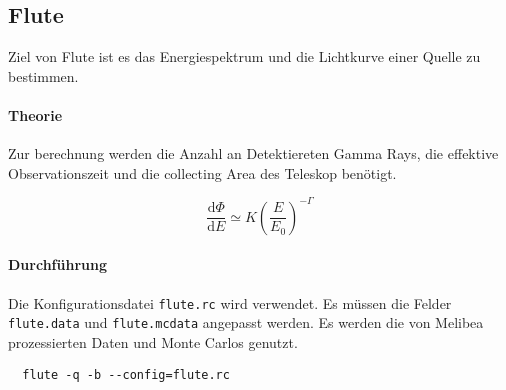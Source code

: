 \subsection{Flute}%
\label{sub:flute}
Ziel von Flute ist es das Energiespektrum und die Lichtkurve einer Quelle zu
bestimmen.

\paragraph{Theorie}%
\label{par:theorie}
Zur berechnung werden die Anzahl an Detektiereten Gamma Rays,
die effektive Observationszeit
und die collecting Area des Teleskop benötigt.

\begin{equation}
\frac{\text{d} \Phi}{\text{d}E} \simeq K \left( \frac{E}{E_0} \right)^{- \Gamma}
\end{equation}


\paragraph{Durchführung}%

Die Konfigurationsdatei \texttt{flute.rc} wird verwendet.
Es müssen die Felder \texttt{flute.data} und \texttt{flute.mcdata} angepasst werden.
Es werden die von Melibea prozessierten Daten und Monte Carlos genutzt.


\begin{lstlisting}
  flute -q -b --config=flute.rc
\end{lstlisting}
